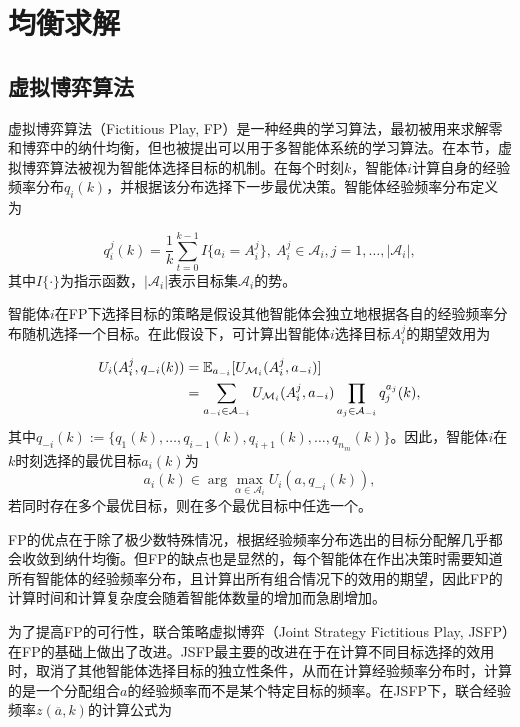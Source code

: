 \section{均衡求解}
\label{pg:upgta:protocal}

\subsection{虚拟博弈算法}
\label{upgta:protocal:FP}
虚拟博弈算法（Fictitious Play, FP）是一种经典的学习算法，最初被用来求解零和博弈中的纳什均衡，但也被提出可以用于多智能体系统的学习算法。在本节，虚拟博弈算法被视为智能体选择目标的机制。在每个时刻$k$，智能体$i$计算自身的经验频率分布$q_i(k)$，并根据该分布选择下一步最优决策。智能体经验频率分布定义为

\begin{equation}
\label{pg:eq:frequency}
	q_i^j(k) = \frac{1}{k} \sum_{t=0}^{k-1} I\{a_i = A_i^j\},\ A_i^j \in \mathcal{A}_i, j = 1,\dots,|\mathcal{A}_i|,
\end{equation}
其中$I\{\cdot\}$为指示函数，$|\mathcal{A}_i|$表示目标集$\mathcal{A}_i$的势。

智能体$i$在FP下选择目标的策略是假设其他智能体会独立地根据各自的经验频率分布随机选择一个目标。在此假设下，可计算出智能体$i$选择目标$A_i^j$的期望效用为

\begin{align}
\label{pg:eq:expectU}
	U_i(A_i^j, q_{-i}(k)) &= \mathbb{E}_{a_{-i}}[U_{\mathcal{M}_i}(A_i^j,a_{-i})]\notag\\
	&= \sum_{a_{-i}\in \mathcal{A}_{-i}} U_{\mathcal{M}_i}(A_i^j, a_{-i}) \prod_{a_j \in \mathcal{A}_{-i}} q_j^{a_j}(k),
\end{align}
其中$q_{-i}(k):=\{q_1(k),\dots,q_{i-1}(k),q_{i+1}(k),\dots,q_{n_m}(k)\}$。因此，智能体$i$在$k$时刻选择的最优目标$a_i(k)$为
\begin{equation}
\label{pg:eq:bestResponse}
	a_i(k) \in \arg \max_{\alpha \in \mathcal{A}_i} U_i(a, q_{-i}(k)),
\end{equation}
若同时存在多个最优目标，则在多个最优目标中任选一个。

FP的优点在于除了极少数特殊情况，根据经验频率分布选出的目标分配解几乎都会收敛到纳什均衡。但FP的缺点也是显然的，每个智能体在作出决策时需要知道所有智能体的经验频率分布，且计算出所有组合情况下的效用的期望，因此FP的计算时间和计算复杂度会随着智能体数量的增加而急剧增加。

为了提高FP的可行性，联合策略虚拟博弈（Joint Strategy Fictitious Play, JSFP）在FP的基础上做出了改进。JSFP最主要的改进在于在计算不同目标选择的效用时，取消了其他智能体选择目标的独立性条件，从而在计算经验频率分布时，计算的是一个分配组合$a$的经验频率而不是某个特定目标的频率。在JSFP下，联合经验频率$z(\overline a,k)$的计算公式为

